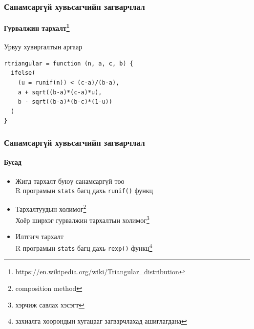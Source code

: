 \documentclass{beamer}
\begin{document}
\begin{frame}[fragile]
\frametitle{Санамсаргүй хувьсагчийн загварчлал}\framesubtitle{Гурвалжин тархалт\footnote{\url{https://en.wikipedia.org/wiki/Triangular_distribution}}}
\begin{figure}
\end{figure}
\vskip-2mm
Урвуу хувиргалтын аргаар
\begin{lstlisting}[keywords={function,ifelse,runif,sqrt}]
rtriangular = function (n, a, c, b) {
  ifelse(
    (u = runif(n)) < (c-a)/(b-a),
    a + sqrt((b-a)*(c-a)*u),
    b - sqrt((b-a)*(b-c)*(1-u))
  )
}
\end{lstlisting}
\end{frame}

\begin{frame}[fragile]
\frametitle{Санамсаргүй хувьсагчийн загварчлал}\framesubtitle{Бусад}
\begin{itemize}
\item Жигд тархалт буюу санамсаргүй тоо \\ R програмын \texttt{stats} багц дахь \lstinline|runif()| функц
\item Тархалтуудын холимог\footnote{composition method} \\ Хоёр ширхэг гурвалжин тархалтын холимог\footnote{хэрчиж савлах хэсэгт}
\item Илтгэгч тархалт \\ R програмын \texttt{stats} багц дахь \lstinline|rexp()| функц\footnote{захиалга хоорондын хугацааг загварчлахад ашиглагдана}
\end{itemize}
\end{frame}
\end{document}
